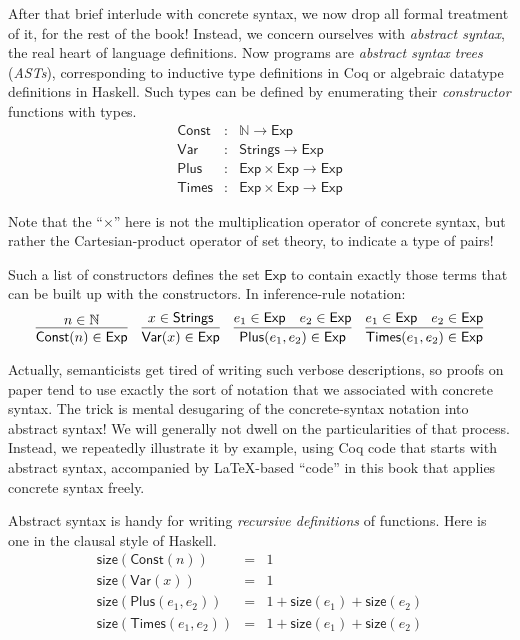 \documentclass{amsbook}
\theoremstyle{definition}
\theoremstyle{remark}
\numberwithin{section}{chapter}
\numberwithin{equation}{chapter}
\begin{document}
After that brief interlude with concrete syntax, we now drop all formal treatment of it, for the rest of the book!
Instead, we concern ourselves with \emph{abstract syntax}, the real heart of language definitions.
Now programs are \emph{abstract syntax trees} (\emph{ASTs}), corresponding to inductive type definitions in Coq or algebraic datatype definitions in Haskell.
Such types can be defined by enumerating their \emph{constructor} functions with types.
\encoding
\begin{eqnarray*}
  \mathsf{Const} &:& \mathbb{N} \to \mathsf{Exp} \\
  \mathsf{Var} &:& \mathsf{Strings} \to \mathsf{Exp} \\
  \mathsf{Plus} &:& \mathsf{Exp} \times \mathsf{Exp} \to \mathsf{Exp} \\
  \mathsf{Times} &:& \mathsf{Exp} \times \mathsf{Exp} \to \mathsf{Exp}
\end{eqnarray*}

Note that the ``$\times$'' here is not the multiplication operator of concrete syntax, but rather the Cartesian-product operator of set theory, to indicate a type of pairs!

Such a list of constructors defines the set $\mathsf{Exp}$ to contain exactly those terms that can be built up with the constructors.
In inference-rule notation:
\encoding
$$\infer{\mathsf{Const}(n) \in \mathsf{Exp}}{
  n \in \mathbb N
}
\quad \infer{\mathsf{Var}(x) \in \mathsf{Exp}}{
  x \in \mathsf{Strings}
}
\quad \infer{\mathsf{Plus}(e_1, e_2) \in \mathsf{Exp}}{
  e_1 \in \mathsf{Exp}
  & e_2 \in \mathsf{Exp}
}
\quad \infer{\mathsf{Times}(e_1, e_2) \in \mathsf{Exp}}{
  e_1 \in \mathsf{Exp}
  & e_2 \in \mathsf{Exp}
}$$

Actually, semanticists get tired of writing such verbose descriptions, so proofs on paper tend to use exactly the sort of notation that we associated with concrete syntax.
The trick is mental desugaring of the concrete-syntax notation into abstract syntax!
We will generally not dwell on the particularities of that process.
Instead, we repeatedly illustrate it by example, using Coq code that starts with abstract syntax, accompanied by \LaTeX{}-based ``code'' in this book that applies concrete syntax freely.

Abstract syntax is handy for writing \emph{recursive definitions} of functions.
Here is one in the clausal style of Haskell.
\begin{eqnarray*}
  \mathsf{size}(\mathsf{Const}(n)) &=& 1 \\
  \mathsf{size}(\mathsf{Var}(x)) &=& 1 \\
  \mathsf{size}(\mathsf{Plus}(e_1, e_2)) &=& 1 + \mathsf{size}(e_1) + \mathsf{size}(e_2) \\
  \mathsf{size}(\mathsf{Times}(e_1, e_2)) &=& 1 + \mathsf{size}(e_1) + \mathsf{size}(e_2)
\end{eqnarray*}
\end{document}
